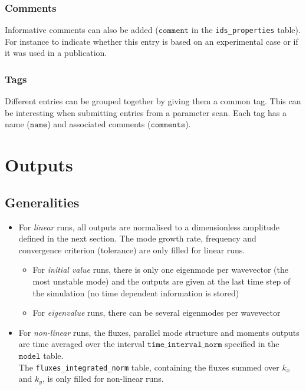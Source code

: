 \documentclass[a4paper]{report}
\begin{document}
\subsection{Comments} \label{sec:comments}
Informative comments can also be added  ($\texttt{comment}$ in the \texttt{ids\_properties} table). For instance to indicate whether this entry is based on an experimental case or if it was used in a publication.

\subsection{Tags} \label{sec:tags}
Different entries can be grouped together by giving them a common tag. This can be interesting when submitting entries from a parameter scan. Each tag has a name ($\texttt{name}$) and associated comments ($\texttt{comments}$).
 

\chapter{Outputs}

\section{Generalities}
\begin{itemize}
 \item For \textit{linear} runs, all outputs are normalised to a dimensionless amplitude defined in the next section.  The mode growth rate, frequency and convergence criterion (tolerance) are only filled for linear runs.
  \begin{itemize}
   \item For \textit{initial value} runs, there is only one eigenmode per wavevector (the most unstable mode) and the outputs are given at the last time step of the simulation (no time dependent information is stored)
   \item For \textit{eigenvalue} runs, there can be several eigenmodes per wavevector
  \end{itemize}	  
 \item For \textit{non-linear} runs, the fluxes, parallel mode structure and moments outputs are time averaged over the interval $\texttt{time\_interval\_norm}$ specified in the $\texttt{model}$ table.\\ 
 The \texttt{fluxes\_integrated\_norm} table, containing the fluxes summed over $k_x$ and $k_y$, is only filled for non-linear runs.
\end{itemize}
\end{document}
